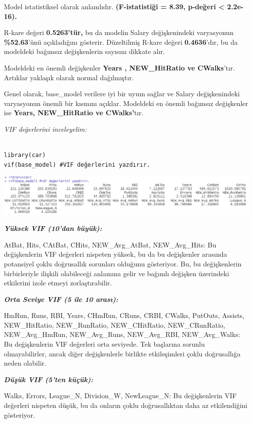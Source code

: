 \documentclass[
]{article}
\begin{document}
Model istatistiksel olarak anlamlıdır. \textbf{(F-istatistiği = 8.39,
p-değeri \textless{} 2.2e-16).}

R-kare değeri \textbf{0.5263'tür,} bu da modelin Salary değişkenindeki
varyasyonun \textbf{\%52.63}'ünü açıkladığını gösterir. Düzeltilmiş
R-kare değeri \textbf{0.4636}'dır, bu da modeldeki bağımsız
değişkenlerin sayısını dikkate alır.

Modeldeki en önemli değişkenler \textbf{Years , NEW\_HitRatio ve
CWalks}'tır. Artıklar yaklaşık olarak normal dağılmıştır.

Genel olarak, base\_model verilere iyi bir uyum sağlar ve Salary
değişkenindeki varyasyonun önemli bir kısmını açıklar. Modeldeki en
önemli bağımsız değişkenler ise \textbf{Years, NEW\_HitRatio ve
CWalks'}tır.

\emph{VIF değerlerini inceleyelim:}

\begin{verbatim}

library(car)
vif(base_model) #VIF değerlerini yazdırır.
\end{verbatim}

\includegraphics[width=7.20833in,height=\textheight]{Capture.JPG}

\textbf{\emph{Yüksek VIF (10'dan büyük):}}

AtBat, Hits, CAtBat, CHits, NEW\_Avg\_AtBat, NEW\_Avg\_Hits: Bu
değişkenlerin VIF değerleri nispeten yüksek, bu da bu değişkenler
arasında potansiyel çoklu doğrusallık sorunları olduğunu gösteriyor. Bu,
bu değişkenlerin birbirleriyle ilişkili olabileceği anlamına gelir ve
bağımlı değişken üzerindeki etkilerini izole etmeyi zorlaştırabilir.

\textbf{\emph{Orta Seviye VIF (5 ile 10 arası):}}

HmRun, Runs, RBI, Years, CHmRun, CRuns, CRBI, CWalks, PutOuts, Assists,
NEW\_HitRatio, NEW\_RunRatio, NEW\_CHitRatio, NEW\_CRunRatio,
NEW\_Avg\_HmRun, NEW\_Avg\_Runs, NEW\_Avg\_RBI, NEW\_Avg\_Walks: Bu
değişkenlerin VIF değerleri orta seviyede. Tek başlarına sorunlu
olmayabilirler, ancak diğer değişkenlerle birlikte etkileşimleri çoklu
doğrusallığa neden olabilir.

\textbf{\emph{Düşük VIF (5'ten küçük):}}

Walks, Errors, League\_N, Division\_W, NewLeague\_N: Bu değişkenlerin
VIF değerleri nispeten düşük, bu da onların çoklu doğrusallıktan daha az
etkilendiğini gösteriyor.
\end{document}
